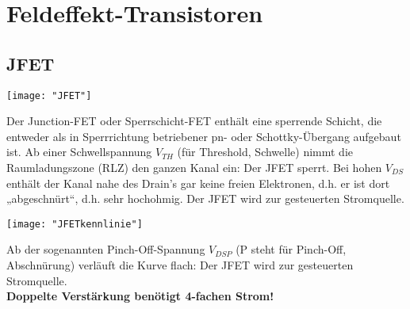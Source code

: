 \section{Feldeffekt-Transistoren}
\subsection{JFET}
\begin{minipage}[t]{0.3\textwidth}
	\vspace{0pt}								%
	\texttt{[image: "JFET"]}
\end{minipage}\hspace{0.05\textwidth}
\begin{minipage}[t]{0.65\textwidth}
	\vspace{0pt}								%
	Der Junction-FET oder Sperrschicht-FET enthält eine sperrende Schicht, die entweder als in
	Sperrrichtung betriebener pn- oder Schottky-Übergang aufgebaut ist.
	Ab einer Schwellspannung $V_{TH}$ (für Threshold, Schwelle) nimmt die Raumladungszone (RLZ) den ganzen Kanal ein:
	Der JFET sperrt. Bei hohen $V_{DS}$ enthält der Kanal nahe des Drain's gar keine freien Elektronen,
	d.h. er ist dort „abgeschnürt“, d.h. sehr hochohmig. Der JFET wird zur gesteuerten
	Stromquelle. \\
\end{minipage}
\vspace{2mm}

\begin{minipage}[t]{0.3\textwidth}
	\vspace{0pt}								%
	\texttt{[image: "JFETkennlinie"]}
\end{minipage}\hspace{0.05\textwidth}
\begin{minipage}[t]{0.65\textwidth}
	\vspace{0pt}								%
	Ab der sogenannten Pinch-Off-Spannung $V_{DSP}$ (P steht für Pinch-Off, Abschnürung) verläuft die
	Kurve flach: Der JFET wird zur gesteuerten Stromquelle.\\
	\textbf{Doppelte Verstärkung benötigt 4-fachen Strom!}
	
	\\
\end{minipage}
\vspace{2mm}



